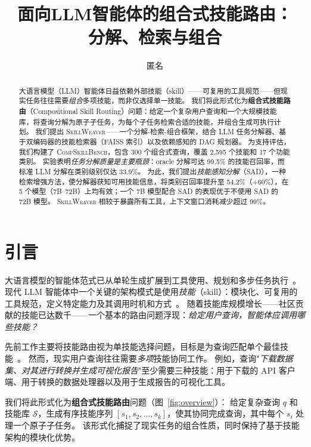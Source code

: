 \documentclass[11pt,a4paper]{ctexart}
\title{\textbf{面向LLM智能体的组合式技能路由：\\分解、检索与组合}}
\author{匿名}
\date{}
\newcommand{\system}{\textsc{SkillWeaver}}
\newcommand{\benchmark}{\textsc{CompSkillBench}}
\begin{document}
\maketitle

\begin{abstract}
大语言模型（LLM）智能体日益依赖外部技能（skill）——可复用的工具规范——但现实任务往往需要\emph{组合}多项技能，而非仅选择单一技能。
我们将此形式化为\textbf{组合式技能路由}（Compositional Skill Routing）问题：给定一个复杂用户查询和一个大规模技能库，将查询分解为原子子任务，为每个子任务检索合适的技能，并组合生成可执行计划。
我们提出 \system{}——一个分解-检索-组合框架，结合 LLM 任务分解器、基于双编码器的技能检索器（FAISS 索引）以及依赖感知的 DAG 规划器。
为支持评估，我们构建了 \benchmark{}，包含 300 个组合式查询，覆盖 2{,}595 个技能和 17 个功能类别。
实验表明\emph{任务分解质量是主要瓶颈}：oracle 分解可达 99.5\% 的技能召回率，而标准 LLM 分解在类别级别仅达 33.9\%。
为此，我们提出\emph{技能感知分解}（SAD），一种检索增强方法，使分解器获知可用技能信息，将类别召回率提升至 54.2\%（+60\%），在 5 个模型（7B--72B）上均有效；一个 7B 模型配合 SAD 的表现优于不使用 SAD 的 72B 模型。
\system{} 相较于暴露所有工具，上下文窗口消耗减少超过 99\%。
\end{abstract}

\section{引言}
\label{sec:intro}

大语言模型的智能体范式已从单轮生成扩展到工具使用、规划和多步任务执行~\citep{schick2023toolformer,qin2023toolllm,patil2023gorilla}。
现代 LLM 智能体中一个关键的架构模式是使用\emph{技能}（skill）：模块化、可复用的工具规范，定义特定能力及其调用时机和方式~\citep{anthropic2025skills}。
随着技能库规模增长——社区贡献的技能已达数千——一个基本的路由问题浮现：\emph{给定用户查询，智能体应调用哪些技能？}

先前工作主要将技能路由视为单技能选择问题，目标是为查询匹配单个最佳技能~\citep{xu2025skillrouter}。
然而，现实用户查询往往需要\emph{多项}技能协同工作。
例如，查询"\textit{下载数据集、对其进行转换并生成可视化报告}"至少需要三种技能：用于下载的 API 客户端、用于转换的数据处理器以及用于生成报告的可视化工具。

我们将此形式化为\textbf{组合式技能路由}问题（图~\ref{fig:overview}）：
给定复杂查询 $q$ 和技能库 $\mathcal{S}$，生成有序技能序列 $[s_1, s_2, \ldots, s_k]$，使其协同完成查询，其中每个 $s_i$ 处理一个原子子任务。
该形式化捕捉了现实任务的组合性质，同时保持了基于技能架构的模块化优势。
\end{document}
